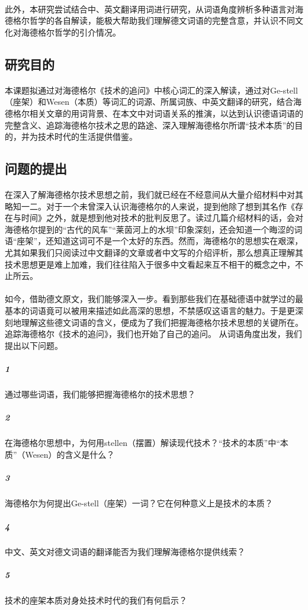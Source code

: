 \documentclass{article}
\begin{document}
		\paragraph{}
此外，本研究尝试结合中、英文翻译用词进行研究，从词语角度辨析多种语言对海德格尔哲学的各自解读，能极大帮助我们理解德文词语的完整含意，并认识不同文化对海德格尔哲学的引介情况。
	
	\subsection{研究目的}
		\paragraph{}
        本课题拟通过对海德格尔《技术的追问》中核心词汇的深入解读，通过对Ge-stell（座架）和Wesen（本质）等词汇的词源、所属词族、中英文翻译的研究，结合海德格尔相关文章的用词背景、在本文中对词语关系的推演，以达到认识德语词语的完整含义、追踪海德格尔技术之思的路途、深入理解海德格尔所谓“技术本质”的目的，并为技术时代的生活提供借鉴。
    \subsection{问题的提出}
		\paragraph{}
     	在深入了解海德格尔技术思想之前，我们就已经在不经意间从大量介绍材料中对其略知一二。对于一个未曾深入认识海德格尔的人来说，提到他除了想到其名作《存在与时间》之外，就是想到他对技术的批判反思了。读过几篇介绍材料的话，会对海德格尔提到的“古代的风车”“莱茵河上的水坝”印象深刻，还会知道一个晦涩的词语“座架”，还知道这词可不是一个太好的东西。然而，海德格尔的思想实在艰深，尤其如果我们只阅读过中文翻译的文章或者中文写的介绍评析，那么想真正理解其技术思想更是难上加难，我们往往陷入于很多中文看起来互不相干的概念之中，不止所云。
     	\paragraph{}
     	如今，借助德文原文，我们能够深入一步。看到那些我们在基础德语中就学过的最基本的词语竟可以被用来描述如此高深的思想，不禁感叹这语言的魅力。于是更深刻地理解这些德文词语的含义，便成为了我们把握海德格尔技术思想的关键所在。追踪海德格尔《技术的追问》，我们也开始了自己的追问。
     	从词语角度出发，我们提出以下问题。
		\subparagraph{1} 
            通过哪些词语，我们能够把握海德格尔的技术思想？
		\subparagraph{2} 
           在海德格尔思想中，为何用stellen（摆置）解读现代技术？“技术的本质”中“本质”（Wesen）的含义是什么？
		\subparagraph{3}海德格尔为何提出Ge-stell（座架）一词？它在何种意义上是技术的本质？
		\subparagraph{4}中文、英文对德文词语的翻译能否为我们理解海德格尔提供线索？
		\subparagraph{5}技术的座架本质对身处技术时代的我们有何启示？
\end{document}
